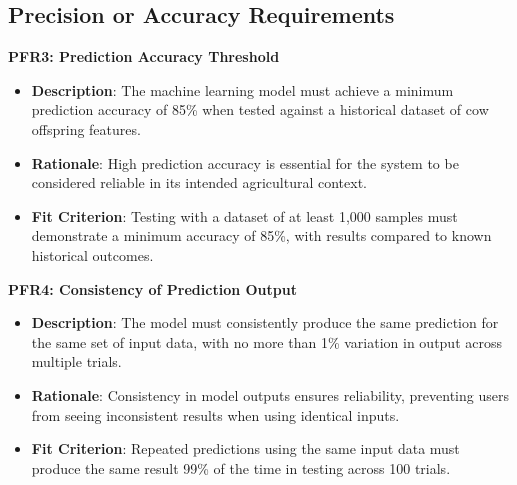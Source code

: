 \documentclass[12pt]{article}
\begin{document}
\subsection{Precision or Accuracy Requirements}
\textbf{PFR3: Prediction Accuracy Threshold}
\begin{itemize}
    \item \textbf{Description}: The machine learning model must achieve a
    minimum prediction accuracy of 85\% when tested against a historical dataset
    of cow offspring features.
    \item \textbf{Rationale}: High prediction accuracy is essential for the
    system to be considered reliable in its intended agricultural context.
    \item \textbf{Fit Criterion}: Testing with a dataset of at least 1,000
    samples must demonstrate a minimum accuracy of 85\%, with results compared
    to known historical outcomes.
\end{itemize}
\textbf{PFR4: Consistency of Prediction Output}
\begin{itemize}
    \item \textbf{Description}: The model must consistently produce the same
    prediction for the same set of input data, with no more than 1\% variation
    in output across multiple trials.
    \item \textbf{Rationale}: Consistency in model outputs ensures reliability,
    preventing users from seeing inconsistent results when using identical
    inputs.
    \item \textbf{Fit Criterion}: Repeated predictions using the same input data
    must produce the same result 99\% of the time in testing across 100 trials.
\end{itemize}
\end{document}
